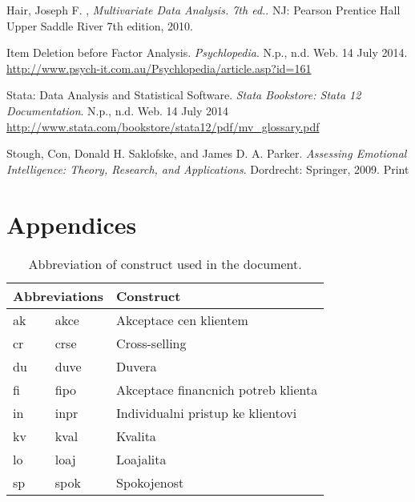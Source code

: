 \documentclass[10pt,a4paper]{article}
\begin{document}
\clearpage
\begin{thebibliography}{9}

  Hair, Joseph F. ,
  \emph{Multivariate Data Analysis. 7th ed.}.
  NJ: Pearson Prentice Hall Upper Saddle River
  7th edition,
  2010.

Item Deletion before Factor Analysis. \emph{Psychlopedia}. N.p., n.d. Web. 14 July 2014. \url{http://www.psych-it.com.au/Psychlopedia/article.asp?id=161}

 Stata: Data Analysis and Statistical Software. \emph{Stata Bookstore: Stata 12 Documentation}. N.p., n.d. Web. 14 July 2014 \url{http://www.stata.com/bookstore/stata12/pdf/mv_glossary.pdf}

 Stough, Con, Donald H. Saklofske, and James D. A. Parker. \emph{Assessing Emotional Intelligence: Theory, Research, and Applications}. Dordrecht: Springer, 2009. Print

\end{thebibliography}

\section*{Appendices}
\begin{table}[htbp]
  \centering
    \begin{tabular}{ll|l}
    \hline\multicolumn{2}{c}{Abbreviations} & Construct \\\hline
    ak    & akce  & Akceptace cen klientem \\
    cr    & crse  & Cross-selling  \\
    du    & duve  & Duvera \\
    fi    & fipo  & Akceptace financnich potreb klienta \\
    in    & inpr  & Individualni pristup ke klientovi \\
    kv    & kval  & Kvalita \\
    lo    & loaj  & Loajalita \\
    sp    & spok  & Spokojenost \\
    \end{tabular}%
      \caption{Abbreviation of construct used in the document.}
  \label{tab:addlabel}%
\end{table}%
\end{document}
